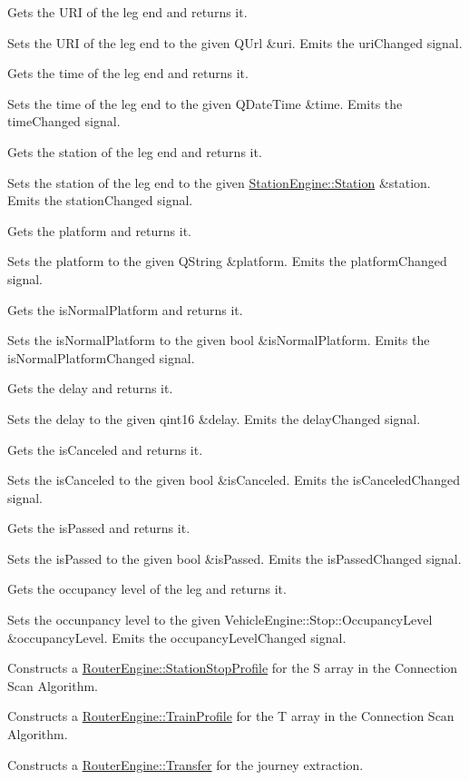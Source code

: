 Gets the U\+RI of the leg end and returns it.

Sets the U\+RI of the leg end to the given Q\+Url \&uri. Emits the uri\+Changed signal.

Gets the time of the leg end and returns it.

Sets the time of the leg end to the given Q\+Date\+Time \&time. Emits the time\+Changed signal.

Gets the station of the leg end and returns it.

Sets the station of the leg end to the given \mbox{\hyperlink{classStationEngine_1_1Station}{Station\+Engine\+::\+Station}} \&station. Emits the station\+Changed signal.

Gets the platform and returns it.

Sets the platform to the given Q\+String \&platform. Emits the platform\+Changed signal.

Gets the is\+Normal\+Platform and returns it.

Sets the is\+Normal\+Platform to the given bool \&is\+Normal\+Platform. Emits the is\+Normal\+Platform\+Changed signal.

Gets the delay and returns it.

Sets the delay to the given qint16 \&delay. Emits the delay\+Changed signal.

Gets the is\+Canceled and returns it.

Sets the is\+Canceled to the given bool \&is\+Canceled. Emits the is\+Canceled\+Changed signal.

Gets the is\+Passed and returns it.

Sets the is\+Passed to the given bool \&is\+Passed. Emits the is\+Passed\+Changed signal.

Gets the occupancy level of the leg and returns it.

Sets the occunpancy level to the given Vehicle\+Engine\+::\+Stop\+::\+Occupancy\+Level \&occupancy\+Level. Emits the occupancy\+Level\+Changed signal.

Constructs a \mbox{\hyperlink{classRouterEngine_1_1StationStopProfile}{Router\+Engine\+::\+Station\+Stop\+Profile}} for the S array in the Connection Scan Algorithm.

Constructs a \mbox{\hyperlink{classRouterEngine_1_1TrainProfile}{Router\+Engine\+::\+Train\+Profile}} for the T array in the Connection Scan Algorithm.

Constructs a \mbox{\hyperlink{classRouterEngine_1_1Transfer}{Router\+Engine\+::\+Transfer}} for the journey extraction.

